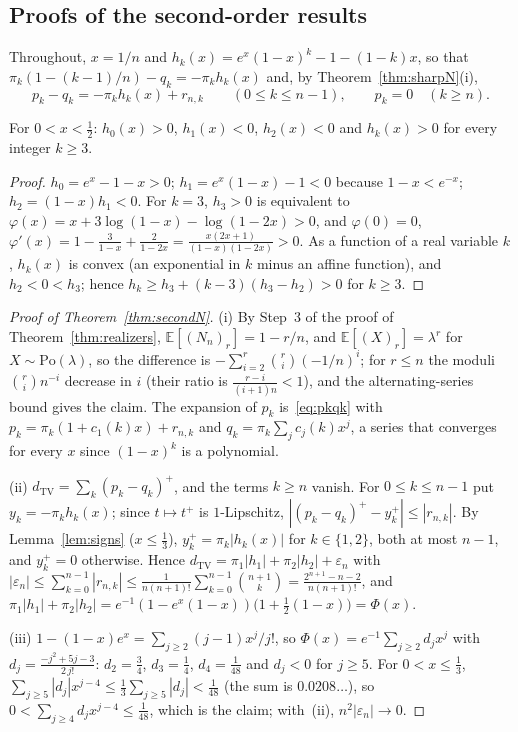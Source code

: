 \subsection*{Proofs of the second-order results}
Throughout, $x=1/n$ and $h_k(x)=e^x(1-x)^k-1-(1-k)x$, so that $\pi_k(1-(k-1)/n)-q_k=-\pi_kh_k(x)$ and, by Theorem~\ref{thm:sharpN}(i),
\begin{equation}\label{eq:pkqk}
p_k-q_k=-\pi_kh_k(x)+r_{n,k}\qquad(0\le k\le n-1),\qquad p_k=0\quad(k\ge n).
\end{equation}

\begin{lemma}[Signs]\label{lem:signs}
For $0<x<\tfrac12$: $h_0(x)>0$, $h_1(x)<0$, $h_2(x)<0$ and $h_k(x)>0$ for every integer $k\ge3$. 
\end{lemma}

\begin{proof}
$h_0=e^x-1-x>0$; $h_1=e^x(1-x)-1<0$ because $1-x<e^{-x}$; $h_2=(1-x)h_1<0$. For $k=3$, $h_3>0$ is equivalent to $\varphi(x)=x+3\log(1-x)-\log(1-2x)>0$, and $\varphi(0)=0$, $\varphi'(x)=1-\frac3{1-x}+\frac2{1-2x}=\frac{x(2x+1)}{(1-x)(1-2x)}>0$. As a function of a real variable $k$, $h_k(x)$ is convex (an exponential in $k$ minus an affine function), and $h_2<0<h_3$; hence $h_k\ge h_3+(k-3)(h_3-h_2)>0$ for $k\ge3$.
\end{proof}

\begin{proof}[Proof of Theorem~\ref{thm:secondN}]
(i) By Step~3 of the proof of Theorem~\ref{thm:realizers}, $\mathbb E[(N_n)_r]=1-r/n$, and $\mathbb E[(X)_r]=\lambda^r$ for $X\sim\mathrm{Po}(\lambda)$, so the difference is $-\sum_{i=2}^r\binom ri(-1/n)^i$; for $r\le n$ the moduli $\binom rin^{-i}$ decrease in $i$ (their ratio is $\frac{r-i}{(i+1)n}<1$), and the alternating-series bound gives the claim. The expansion of $p_k$ is~\eqref{eq:pkqk} with $p_k=\pi_k(1+c_1(k)x)+r_{n,k}$ and $q_k=\pi_k\sum_jc_j(k)x^j$, a series that converges for every $x$ since $(1-x)^k$ is a polynomial.

(ii) $d_{\mathrm{TV}}=\sum_k(p_k-q_k)^+$, and the terms $k\ge n$ vanish. For $0\le k\le n-1$ put $y_k=-\pi_kh_k(x)$; since $t\mapsto t^+$ is $1$-Lipschitz, $|(p_k-q_k)^+-y_k^+|\le|r_{n,k}|$. By Lemma~\ref{lem:signs} ($x\le\tfrac13$), $y_k^+=\pi_k|h_k(x)|$ for $k\in\{1,2\}$, both at most $n-1$, and $y_k^+=0$ otherwise. Hence $d_{\mathrm{TV}}=\pi_1|h_1|+\pi_2|h_2|+\varepsilon_n$ with $|\varepsilon_n|\le\sum_{k=0}^{n-1}|r_{n,k}|\le\frac1{n(n+1)!}\sum_{k=0}^{n-1}\binom{n+1}k=\frac{2^{n+1}-n-2}{n(n+1)!}$, and $\pi_1|h_1|+\pi_2|h_2|=e^{-1}(1-e^x(1-x))\bigl(1+\tfrac12(1-x)\bigr)=\Phi(x)$.

(iii) $1-(1-x)e^x=\sum_{j\ge2}(j-1)x^j/j!$, so $\Phi(x)=e^{-1}\sum_{j\ge2}d_jx^j$ with $d_j=\frac{-j^2+5j-3}{2\,j!}$: $d_2=\tfrac34$, $d_3=\tfrac14$, $d_4=\tfrac1{48}$ and $d_j<0$ for $j\ge5$. For $0<x\le\tfrac13$, $\sum_{j\ge5}|d_j|x^{j-4}\le\tfrac13\sum_{j\ge5}|d_j|<\tfrac1{48}$ (the sum is $0.0208\ldots$), so $0<\sum_{j\ge4}d_jx^{j-4}\le\tfrac1{48}$, which is the claim; with~(ii), $n^2|\varepsilon_n|\to0$.
\end{proof}

